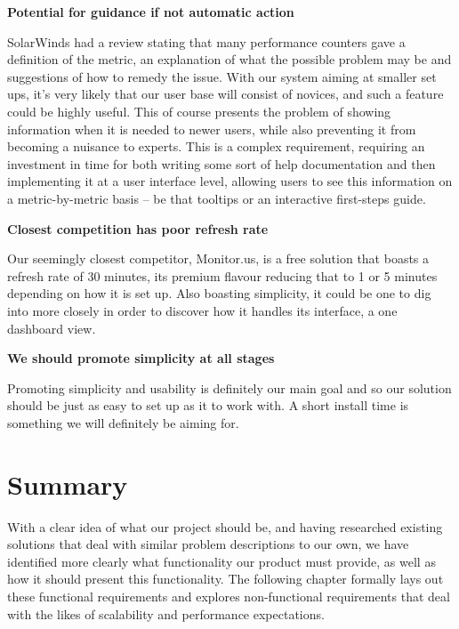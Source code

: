 \documentclass{l3proj}
\begin{document}
\textbf{Potential for guidance if not automatic action}

SolarWinds had a review stating that many performance counters gave a definition of the metric, an explanation of what the possible problem may be and suggestions of how to remedy the issue. With our system aiming at smaller set ups, it's very likely that our user base will consist of novices, and such a feature could be highly useful. This of course presents the problem of showing information when it is needed to newer users, while also preventing it from becoming a nuisance to experts. This is a complex requirement, requiring an investment in time for both writing some sort of help documentation and then implementing it at a user interface level, allowing users to see this information on a metric-by-metric basis -- be that tooltips or an interactive first-steps guide.

\textbf{Closest competition has poor refresh rate}

Our seemingly closest competitor, Monitor.us, is a free solution that boasts a refresh rate of 30 minutes, its premium flavour reducing that to 1 or 5 minutes depending on how it is set up. Also boasting simplicity, it could be one to dig into more closely in order to discover how it handles its interface, a one dashboard view.

\textbf{We should promote simplicity at all stages}

Promoting simplicity and usability is definitely our main goal and so our solution should be just as easy to set up as it to work with. A short install time is something we will definitely be aiming for.


\section{Summary}

With a clear idea of what our project should be, and having researched existing solutions that deal with similar problem descriptions to our own, we have identified more clearly what functionality our product must provide, as well as how it should present this functionality. The following chapter formally lays out these functional requirements and explores non-functional requirements that deal with the likes of scalability and performance expectations.
\end{document}
